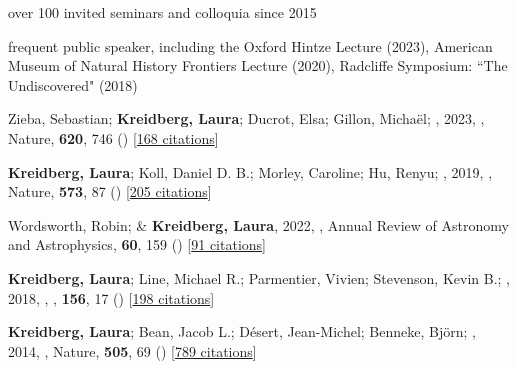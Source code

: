 \documentclass[12pt,letterpaper]{article}
\begin{document}
\begin{list}{}{\cvlist}
\item over 100 invited seminars and colloquia since 2015 
\item frequent public speaker, including the
    Oxford Hintze Lecture (2023), American Museum of Natural History Frontiers Lecture (2020), Radcliffe Symposium: ``The Undiscovered" (2018)
\end{list}






\begin{list}{}{\cvlist}
\item[{\color{numcolor}\scriptsize1}] Zieba, Sebastian; \textbf{Kreidberg, Laura}; Ducrot, Elsa; Gillon, Micha{\"e}l; \etal, 2023, , Nature, \textbf{620}, 746 () [\href{https://ui.adsabs.harvard.edu/abs/2023Natur.620..746Z}{168 citations}]

\item[{\color{numcolor}\scriptsize2}] \textbf{Kreidberg, Laura}; Koll, Daniel D. B.; Morley, Caroline; Hu, Renyu; \etal, 2019, , Nature, \textbf{573}, 87 () [\href{https://ui.adsabs.harvard.edu/abs/2019Natur.573...87K}{205 citations}]

\item[{\color{numcolor}\scriptsize3}] Wordsworth, Robin; \& \textbf{Kreidberg, Laura}, 2022, , Annual Review of Astronomy and Astrophysics, \textbf{60}, 159 () [\href{https://ui.adsabs.harvard.edu/abs/2022ARA&A..60..159W}{91 citations}]

\item[{\color{numcolor}\scriptsize4}] \textbf{Kreidberg, Laura}; Line, Michael R.; Parmentier, Vivien; Stevenson, Kevin B.; \etal, 2018, , \aj, \textbf{156}, 17 () [\href{https://ui.adsabs.harvard.edu/abs/2018AJ....156...17K}{198 citations}]


\item[{\color{numcolor}\scriptsize5}] \textbf{Kreidberg, Laura}; Bean, Jacob L.; D{\'e}sert, Jean-Michel; Benneke, Bj{\"o}rn; \etal, 2014, , Nature, \textbf{505}, 69 () [\href{https://ui.adsabs.harvard.edu/abs/2014Natur.505...69K}{789 citations}]

\end{list}
\end{document}
